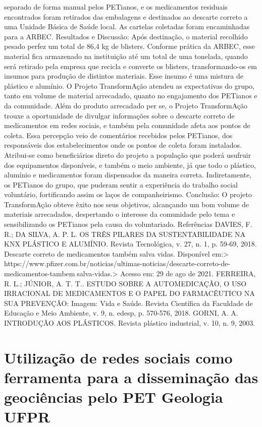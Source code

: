 separado de forma manual pelos PETianos, e os medicamentos residuais encontrados foram 
retirados das embalagens e destinados ao descarte correto a uma Unidade Básica de Saúde local. 
As cartelas coletadas foram encaminhadas para a ARBEC. Resultados e Discussão: Após 
destinação, o material recolhido pesado perfez um total de 86,4 kg de blisters. Conforme prática 
da ARBEC, esse material fica armazenado na instituição até um total de uma tonelada, quando 
será retirado pela empresa que recicla e converte os blisters, transformando-os em insumos para 
produção de distintos materiais. Esse insumo é uma mistura de plástico e alumínio. O Projeto 
TransformAção atendeu as expectativas do grupo, tanto em volume de material arrecadado, quanto 
no engajamento dos PETianos e da comunidade. Além do produto arrecadado per se, o Projeto 
TransformAção trouxe a oportunidade de divulgar informações sobre o descarte correto de 
medicamentos em redes sociais, e também pela comunidade afeta aos pontos de coleta. Essa 
percepção veio de comentários recebidos pelos PETianos, dos responsáveis dos estabelecimentos 
onde os pontos de coleta foram instalados. Atribui-se como beneficiários direto do projeto a 
população que poderá usufruir dos equipamentos disponíveis, e também o meio ambiente, já que 
todo o plástico, alumínio e medicamentos foram dispensados da maneira correta. Indiretamente, 
os PETianos do grupo, que puderam sentir a experiência do trabalho social voluntário, fortificando 
assim os laços de companheirismo. Conclusão: O projeto TransformAção obteve êxito nos seus 
objetivos, alcançando um bom volume de materiais arrecadados, despertando o interesse da 
comunidade pelo tema e sensibilizando os PETianos pela causa do voluntariado.
Referências
DAVIES, F. R.; DA SILVA, A. P. L. OS TRÊS PILARES DA SUSTENTABILIDADE NA KNX 
PLÁSTICO E ALUMÍNIO. Revista Tecnológica, v. 27, n. 1, p. 59-69, 2018.
Descarte correto de medicamentos também salva vidas. Disponível em:> 
https://www.pfizer.com.br/noticias/ultimas-noticias/descarte-correto-de-medicamentos-tambemsalva-vidas.> Acesso em: 29 de ago de 2021.
FERREIRA, R. L.; JÚNIOR, A. T. T.. ESTUDO SOBRE A AUTOMEDICAÇÃO, O USO 
IRRACIONAL DE MEDICAMENTOS E O PAPEL DO FARMACÊUTICO NA SUA 
PREVENÇÃO: Imagem: Vida e Saúde. Revista Científica da Faculdade de Educação e Meio 
Ambiente, v. 9, n. edesp, p. 570-576, 2018.
GORNI, A. A. INTRODUÇÃO AOS PLÁSTICOS. Revista plástico industrial, v. 10, n. 9, 2003.



\section{Utilização de redes sociais como ferramenta para a disseminação das geociências pelo PET Geologia UFPR}

